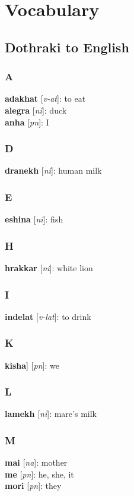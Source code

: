 \chapter{Vocabulary}
\section*{Dothraki to English}
\begin{multicols}{2}
\subsection*{A}
\textbf{adakhat} [\textit{v-at}]: to eat \\
\textbf{alegra} [\textit{ni}]: duck \\
\textbf{anha} [\textit{pn}]: I \\
\subsection*{D}
\textbf{dranekh} [\textit{ni}]: human milk \\
\subsection*{E}
\textbf{eshina} [\textit{ni}]: fish \\
\subsection*{H}
\textbf{hrakkar} [\textit{ni}]: white lion \\
\subsection*{I}
\textbf{indelat} [\textit{v-lat}]: to drink \\
\subsection*{K}
\textbf{kisha}] [\textit{pn}]: we \\
\subsection*{L}
\textbf{lamekh} [\textit{ni}]: mare's milk \\
\subsection*{M}
\textbf{mai} [\textit{na}]: mother \\
\textbf{me} [\textit{pn}]: he, she, it \\
\textbf{mori} [\textit{pn}]: they \\

\end{multicols}
